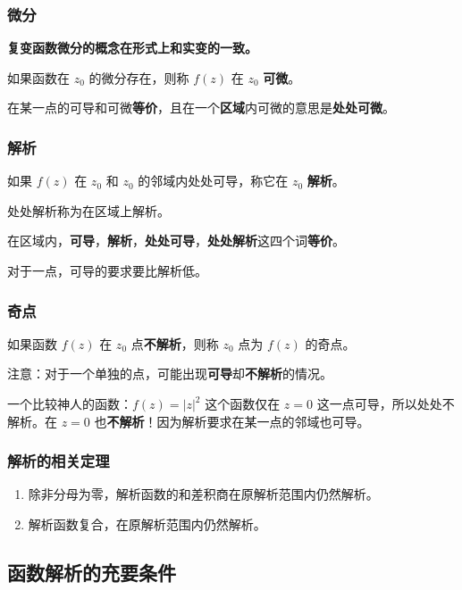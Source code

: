 \subsubsection{微分}
\label{微分}
\textbf{复变函数微分的概念在形式上和实变的一致。}

如果函数在 \(z_0\) 的微分存在，则称 \(f(z)\) 在 \(z_0\) \textbf{可微}。

在某一点的可导和可微\textbf{等价}，且在一个\textbf{区域}内可微的意思是\textbf{处处可微}。
\subsubsection{解析}
\label{解析}
如果 \(f(z)\) 在 \(z_0\) 和 \(z_0\) 的邻域内处处可导，称它在 \(z_0\)
\textbf{解析}。

处处解析称为在区域上解析。

在区域内，\textbf{可导}，\textbf{解析}，\textbf{处处可导}，\textbf{处处解析}这四个词\textbf{等价}。

对于一点，可导的要求要比解析低。
\subsubsection{奇点}
\label{奇点}
如果函数 \(f(z)\) 在 \(z_0\) 点\textbf{不解析}，则称 \(z_0\) 点为 \(f(z)\)
的奇点。

注意：对于一个单独的点，可能出现\textbf{可导}却\textbf{不解析}的情况。

\begin{tcolorbox}[title={Note},colback=red!5!white
,colframe=red!75!black
,colbacktitle=yellow!50!red
,coltitle=red!25!black, fonttitle=\bfseries,subtitle style={boxrule=0.4pt, colback=yellow!50!red!25!white}]
一个比较神人的函数：\(f(z)=|z|^2\)
这个函数仅在 \(z=0\) 这一点可导，所以处处不解析。在 \(z=0\) 也\textbf{不解析}！因为解析要求在某一点的邻域也可导。

\end{tcolorbox}
\subsubsection{解析的相关定理}
\label{解析的相关定理}
\begin{enumerate}
\item 除非分母为零，解析函数的和差积商在原解析范围内仍然解析。
\item 解析函数复合，在原解析范围内仍然解析。
\end{enumerate}
\subsection{函数解析的充要条件}
\label{函数解析的充要条件}
